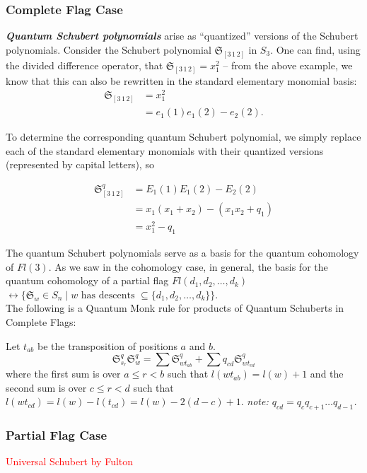 \documentclass[11pt]{article}
\begin{document}
\subsubsection{Complete Flag Case}
\textbf{\textit{Quantum Schubert polynomials}} arise as ``quantized'' versions of the Schubert polynomials. Consider the Schubert polynomial $\mathfrak{S}_{[3 \, 1 \, 2]}$ in $S_3$. One can find, using the divided difference operator, that $\mathfrak{S}_{[3 \, 1 \, 2]} = x_1^2$ -- from the above example, we know that this can also be rewritten in the standard elementary monomial basis:
\begin{align*}
    \mathfrak{S}_{[3 \, 1 \, 2]} &= x_1^2 \\
    &= e_1(1) e_1(2) - e_2(2).
\end{align*}

To determine the corresponding quantum Schubert polynomial, we simply replace each of the standard elementary monomials with their quantized versions (represented by capital letters), so

\begin{align*}
    \mathfrak{S}_{[3 \, 1 \, 2]}^q &= E_1(1) E_1(2) - E_2(2) \\
    &= x_1(x_1 + x_2) - (x_1x_2 + q_1) \\
    &= x_1^2 - q_1
\end{align*}

The quantum Schubert polynomials serve as a basis for the quantum cohomology of $Fl(3)$. As we saw in the cohomology case, in general, the basis for the quantum cohomology of a partial flag $Fl(d_1, d_2, \dots, d_k)$ $ \leftrightarrow \{\mathfrak{S}_w \in S_n \mid w \text{ has descents } \subseteq \{ d_1, d_2, \dots, d_k\} \}$. \\

The following is a Quantum Monk rule for products of Quantum Schuberts in Complete Flags:
\begin{theorem*}
Let $t_{ab}$ be the transposition of positions $a$ and $b$.
    \[
        \mathfrak{S}_{s_r}^q \mathfrak{S}_{w}^q = \sum \mathfrak{S}_{wt_{ab}}^q + \sum q_{cd}\mathfrak{S}_{wt_{cd}}^q
    \]
    where the first sum is over $a \leq r < b$ such that $l(wt_{ab}) = l(w) + 1$ and the second sum is over $c \leq r < d$ such that $l(wt_{cd}) = l(w) - l(t_{cd}) = l(w) - 2(d - c) + 1$. \textit{note: $q_{cd} = q_c q_{c+1} \dots q_{d-1}$.}
\end{theorem*}

\subsubsection{Partial Flag Case}
\textcolor{red}{Universal Schubert by Fulton}
\end{document}
